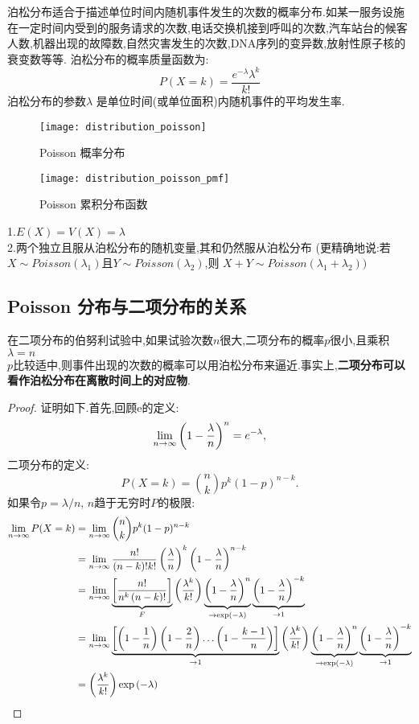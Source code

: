 \documentclass[openany]{book}
\begin{document}
泊松分布适合于描述单位时间内随机事件发生的次数的概率分布.如某一服务设施在一定时间内受到的服务请求的次数,电话交换机接到呼叫的次数,汽车站台的候客人数,机器出现的故障数,自然灾害发生的次数,DNA序列的变异数,放射性原子核的衰变数等等.
泊松分布的概率质量函数为:
$$
P(X=k)={\frac  {e^{{-\lambda }}\lambda ^{k}}{k!}}
$$
泊松分布的参数$\lambda$ 是单位时间(或单位面积)内随机事件的平均发生率.
\begin{figure}[htbp]
  \centering
  \texttt{[image: distribution\_poisson]}\\
  \caption{Poisson 概率分布}\label{fig.distribution.poisson}
\end{figure}

\begin{figure}[htbp]
  \centering
  \texttt{[image: distribution\_poisson\_pmf]}\\
  \caption{Poisson 累积分布函数}\label{fig.distribution.poisson.pmf}
\end{figure}
	
1.$E(X)=V(X)=\lambda$ \\
\noindent
2.两个独立且服从泊松分布的随机变量,其和仍然服从泊松分布 (更精确地说:若$X \sim Poisson(\lambda_1)$且$Y \sim Poisson(\lambda_2)$,则 $X+Y \sim Poisson(\lambda_1+\lambda_2))$

\subsection{Poisson 分布与二项分布的关系}
在二项分布的伯努利试验中,如果试验次数$n$很大,二项分布的概率$p$很小,且乘积$\lambda = n$ \\$p$比较适中,则事件出现的次数的概率可以用泊松分布来逼近.事实上,\textbf{二项分布可以看作泊松分布在离散时间上的对应物}.
\begin{proof}
证明如下.首先,回顾e的定义:
$$
\lim _{{n\to \infty }}\left(1-{\lambda  \over n}\right)^{n}=e^{{-\lambda }},
$$
二项分布的定义:
$$
P(X=k)={n \choose k}p^{k}(1-p)^{{n-k}}.
$$
如果令$p=\lambda /n$, $n$趋于无穷时$P$的极限:
$$
\begin{aligned}
\lim_{{n \to \infty }}P(X=k) & =\lim _{{n\to \infty }}{n \choose k}p^{k}(1-p)^{{n-k}}\\
& = \lim _{{n\to \infty }}{n! \over (n-k)!k!}\left({\lambda \over n}\right)^{k}\left(1-{\lambda \over n}\right)^{{n-k}}\\
& = \lim _{{n\to \infty }}\underbrace {\left[{\frac {n!}{n^{k}\left(n-k\right)!}}\right]}_{F}\left({\frac {\lambda ^{k}}{k!}}\right)\underbrace {\left(1-{\frac {\lambda }{n}}\right)^{n}}_{{\to \exp \left(-\lambda \right)}}\underbrace {\left(1-{\frac {\lambda }{n}}\right)^{{-k}}}_{{\to 1}}\\
& = \lim _{{n\to \infty }}\underbrace {\left[\left(1-{\frac {1}{n}}\right)\left(1-{\frac {2}{n}}\right)\ldots \left(1-{\frac {k-1}{n}}\right)\right]}_{{\to 1}}\left({\frac {\lambda ^{k}}{k!}}\right)\underbrace {\left(1-{\frac {\lambda }{n}}\right)^{n}}_{{\to \exp \left(-\lambda \right)}}\underbrace {\left(1-{\frac {\lambda }{n}}\right)^{{-k}}}_{{\to 1}}\\
& = \left({\frac {\lambda ^{k}}{k!}}\right)\exp \left(-\lambda \right)
\end{aligned}
$$
\end{proof}
\end{document}
